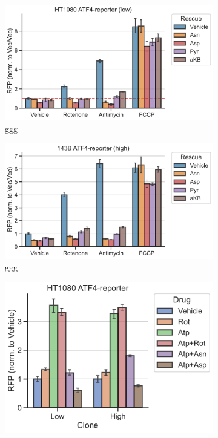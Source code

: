 \begin{figure}
     \centering
     \begin{subfigure}[b]{0.49\textwidth}
         \includegraphics[width=\textwidth]{figures/chap2/app/HT1080_ETCinhib_ATF4rep_low.pdf}
         \caption{ggg}
         \label{fig:app_ch2:HT1080_ETCinhib_ATF4rep_low}
     \end{subfigure}
     \hfill
     \begin{subfigure}[b]{0.49\textwidth}
         \includegraphics[width=\textwidth]{figures/chap2/app/143B_ETCinhib_ATF4rep_high.pdf}
         \caption{ggg}
         \label{fig:app_ch2:143B_ETCinhib_ATF4rep_high}
     \end{subfigure}
     \hfill
     \begin{subfigure}[b]{0.4\textwidth}
         \includegraphics[width=\textwidth]{figures/chap2/app/HT1080_Atp_ATF4rep.pdf}

\end{subfigure}
\end{figure}
